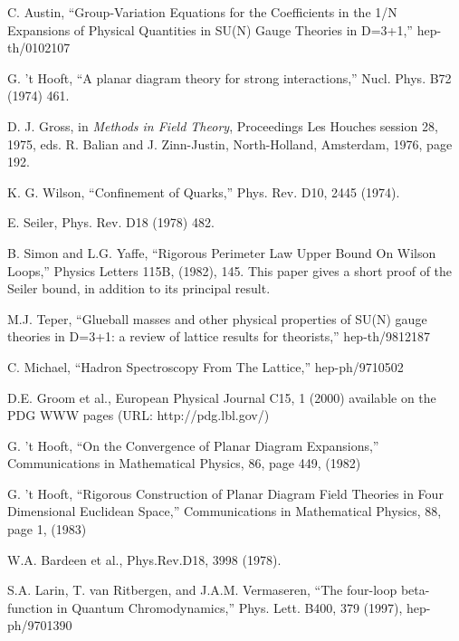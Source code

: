 \documentclass[a4paper,12pt,oneside]{article}
\begin{document}
\begin{thebibliography}{99}

C. Austin, ``Group-Variation Equations for the Coefficients in the 1/N
Expansions of Physical Quantities in SU(N) Gauge Theories in D=3+1,''
hep-th/0102107

G. 't Hooft, ``A planar diagram theory for strong interactions,'' Nucl. Phys. B72 (1974) 461.

D. J. Gross, in \textit{Methods in Field Theory}, Proceedings Les 
Houches session 28, 1975, eds. R. Balian and J. Zinn-Justin, 
North-Holland, Amsterdam, 1976, page 192.

K. G. Wilson, ``Confinement of Quarks,'' Phys. Rev. D10, 2445 (1974).

E. Seiler, Phys. Rev. D18 (1978) 482.

B. Simon and L.G. Yaffe, ``Rigorous Perimeter Law Upper Bound On Wilson
Loops,'' Physics Letters 115B, (1982), 145.  This paper gives a short
proof of the Seiler bound, in addition to its principal result.

M.J. Teper, ``Glueball masses and other physical properties of SU(N) 
gauge theories in D=3+1: a review of lattice results for theorists,'' 
hep-th/9812187

C. Michael, ``Hadron Spectroscopy From The Lattice,'' hep-ph/9710502

D.E. Groom et al., European Physical Journal C15, 1 (2000)
available on the PDG WWW pages (URL: http://pdg.lbl.gov/)

G. 't Hooft, ``On the Convergence of Planar Diagram Expansions,'' 
Communications in Mathematical Physics, 86, page 449, (1982)

G. 't Hooft, ``Rigorous Construction of Planar Diagram Field Theories in 
Four Dimensional Euclidean Space,'' Communications in Mathematical 
Physics, 88, page 1, (1983)

W.A. Bardeen et al., Phys.Rev.D18, 3998 (1978).

S.A. Larin, T. van Ritbergen, and J.A.M. Vermaseren, ``The four-loop 
beta-function in Quantum Chromodynamics,'' Phys. Lett. B400, 379 (1997), 
hep-ph/9701390

\end{thebibliography}
\end{document}
